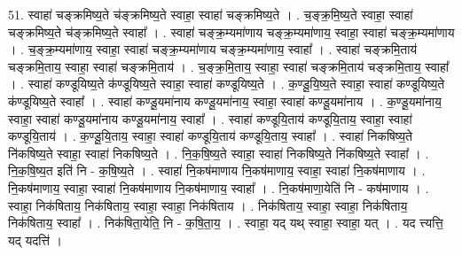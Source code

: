 \documentclass[17pt]{extarticle}
\begin{document}
51. स्वाहा॑ चङ्क्रमिष्य॒ते च॑ङ्क्रमिष्य॒ते स्वाहा॒ स्वाहा॑ चङ्क्रमिष्य॒ते । . च॒ङ्क्र॒मि॒ष्य॒ते स्वाहा॒ स्वाहा॑ चङ्क्रमिष्य॒ते च॑ङ्क्रमिष्य॒ते स्वाहा᳚ । . स्वाहा॑ चङ्क्र॒म्यमा॑णाय चङ्क्र॒म्यमा॑णाय॒ स्वाहा॒ स्वाहा॑ चङ्क्र॒म्यमा॑णाय । . च॒ङ्क्र॒म्यमा॑णाय॒ स्वाहा॒ स्वाहा॑ चङ्क्र॒म्यमा॑णाय चङ्क्र॒म्यमा॑णाय॒ स्वाहा᳚ । . स्वाहा॑ चङ्क्रमि॒ताय॑ चङ्क्रमि॒ताय॒ स्वाहा॒ स्वाहा॑ चङ्क्रमि॒ताय॑ । . च॒ङ्क्र॒मि॒ताय॒ स्वाहा॒ स्वाहा॑ चङ्क्रमि॒ताय॑ चङ्क्रमि॒ताय॒ स्वाहा᳚ । . स्वाहा॑ कण्डूयिष्य॒ते क॑ण्डूयिष्य॒ते स्वाहा॒ स्वाहा॑ कण्डूयिष्य॒ते । . क॒ण्डू॒यि॒ष्य॒ते स्वाहा॒ स्वाहा॑ कण्डूयिष्य॒ते क॑ण्डूयिष्य॒ते स्वाहा᳚ । . स्वाहा॑ कण्डू॒यमा॑नाय कण्डू॒यमा॑नाय॒ स्वाहा॒ स्वाहा॑ कण्डू॒यमा॑नाय । . क॒ण्डू॒यमा॑नाय॒ स्वाहा॒ स्वाहा॑ कण्डू॒यमा॑नाय कण्डू॒यमा॑नाय॒ स्वाहा᳚ । . स्वाहा॑ कण्डूयि॒ताय॑ कण्डूयि॒ताय॒ स्वाहा॒ स्वाहा॑ कण्डूयि॒ताय॑ । . क॒ण्डू॒यि॒ताय॒ स्वाहा॒ स्वाहा॑ कण्डूयि॒ताय॑ कण्डूयि॒ताय॒ स्वाहा᳚ । . स्वाहा॑ निकषिष्य॒ते नि॑कषिष्य॒ते स्वाहा॒ स्वाहा॑ निकषिष्य॒ते । . नि॒क॒षि॒ष्य॒ते स्वाहा॒ स्वाहा॑ निकषिष्य॒ते नि॑कषिष्य॒ते स्वाहा᳚ । . नि॒क॒षि॒ष्य॒त इति॑ नि - क॒षि॒ष्य॒ते । . स्वाहा॑ नि॒कष॑माणाय नि॒कष॑माणाय॒ स्वाहा॒ स्वाहा॑ नि॒कष॑माणाय । . नि॒कष॑माणाय॒ स्वाहा॒ स्वाहा॑ नि॒कष॑माणाय नि॒कष॑माणाय॒ स्वाहा᳚ । . नि॒कष॑माणा॒येति॑ नि - कष॑माणाय । . स्वाहा॒ निक॑षिताय॒ निक॑षिताय॒ स्वाहा॒ स्वाहा॒ निक॑षिताय । . निक॑षिताय॒ स्वाहा॒ स्वाहा॒ निक॑षिताय॒ निक॑षिताय॒ स्वाहा᳚ । . निक॑षिता॒येति॒ नि - क॒षि॒ता॒य॒ । . स्वाहा॒ यद् यथ् स्वाहा॒ स्वाहा॒ यत् । . यद त्त्यत्ति॒ यद् यदत्ति॑ । \newline
\end{document}

